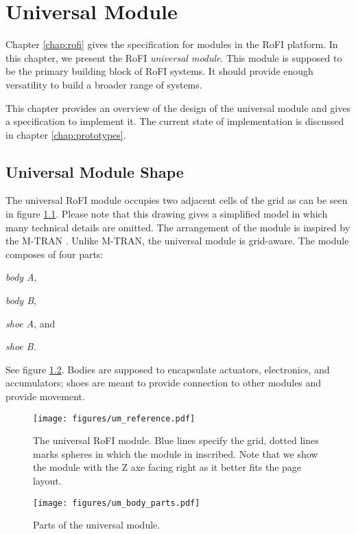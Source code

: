 \chapter{Universal Module}\label{chap:universal_module}

Chapter \ref{chap:rofi} gives the specification for modules in the RoFI
platform. In this chapter, we present the RoFI \emph{universal module}. This
module is supposed to be the primary building block of RoFI systems. It should
provide enough versatility to build a broader range of systems.

This chapter provides an overview of the design of the universal module and
gives a specification to implement it. The current state of implementation is
discussed in chapter \ref{chap:prototypes}.

\section{Universal Module Shape}

The universal RoFI module occupies two adjacent cells of the grid as can be seen
in figure \ref{fig:um_reference}. Please note that this drawing gives a
simplified model in which many technical details are omitted. The arrangement of
the module is inspired by the M-TRAN \cite{kurokawa_distributed_2008}. Unlike
M-TRAN, the universal module is grid-aware. The module composes of four parts:
\begin{enumerate*}
    \item \emph{body A},
    \item \emph{body B},
    \item \emph{shoe A}, and
    \item \emph{shoe B}.
\end{enumerate*}
See figure \ref{fig:um_body_parts}. Bodies are supposed to encapsulate
actuators, electronics, and accumulators; shoes are meant to provide connection
to other modules and provide movement.

\begin{figure}[t]
    \centering
    \texttt{[image: figures/um\_reference.pdf]}
    \caption{The universal RoFI module. Blue lines specify the grid, dotted
    lines marks spheres in which the module in inscribed. Note that we show the
    module with the Z axe facing right as it better fits  the page layout. }
    \label{fig:um_reference}
\end{figure}

\begin{figure}[t]
    \centering
    \texttt{[image: figures/um\_body\_parts.pdf]}
    \caption{Parts of the universal module.}
    \label{fig:um_body_parts}
\end{figure}

